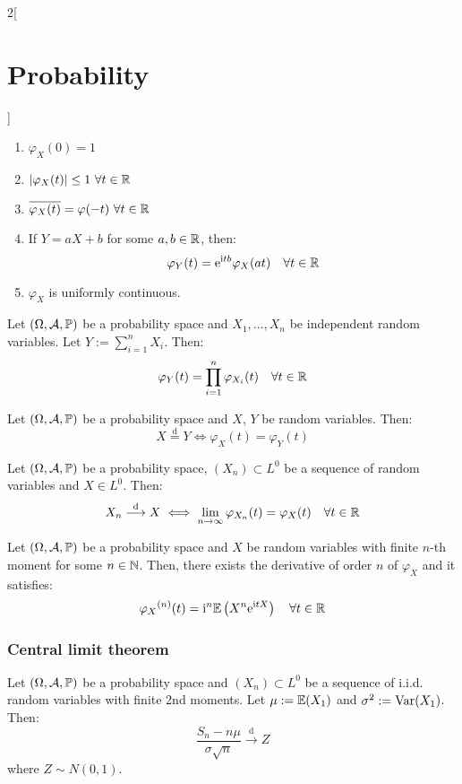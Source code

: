 \documentclass[../../../main.tex]{subfiles}
\begin{document}
\begin{multicols}{2}[\section{Probability}]
\begin{prop}
\begin{enumerate}
            \item $\varphi_X(0)=1$
            \item $|\varphi_X(t)|\leq 1\ \forall t\in\mathbb{R}$
            \item $\overline{\varphi_X(t)}=\varphi(-t)\ \forall t\in\RR$
            \item If $Y=aX+b$ for some $a,b\in \mathbb{R}$, then: $$\varphi_Y(t)=\mathrm{e}^{\mathrm{i} t b}\varphi_X(at)\quad\forall t\in\mathbb{R}$$
            \item $\varphi_X$ is uniformly continuous.
        \end{enumerate}
    \end{prop}
    \begin{theorem}
        Let $(\Omega,\mathcal{A},\mathbb{P})$ be a probability space and $X_1,\ldots,X_n$ be independent random variables. Let $Y:=\sum_{i=1}^n X_i$. Then: $$\varphi_Y(t)=\prod_{i=1}^n\varphi_{X_i}(t)\quad\forall t\in\mathbb{R}$$
    \end{theorem}
    \begin{theorem}
        Let $(\Omega,\mathcal{A},\mathbb{P})$ be a probability space and $X$, $Y$ be random variables. Then: $$X\overset{\text{d}}{=}Y\iff \varphi_X(t)=\varphi_Y(t)$$
    \end{theorem}
    \begin{theorem}
        Let $(\Omega,\mathcal{A},\mathbb{P})$ be a probability space, $(X_n)\subset L^0$ be a sequence of random variables and $X\in L^0$. Then:
        $$X_n\overset{\text{d}}{\longrightarrow} X\iff\lim_{n\to\infty}\varphi_{X_n}(t)=\varphi_X(t)\quad\forall t\in\mathbb{R}$$
    \end{theorem}
    \begin{prop}
        Let $(\Omega,\mathcal{A},\mathbb{P})$ be a probability space and $X$ be random variables with finite $n$-th moment for some $n\in\mathbb{N}$. Then, there exists the derivative of order $n$ of $\varphi_X$ and it satisfies: $${\varphi_X}^{(n)}(t)=\mathrm{i}^n\mathbb{E}\left(X^n\mathrm{e}^{\mathrm{i} t X}\right)\quad\forall t\in\mathbb{R}$$
    \end{prop}
    \subsubsection{Central limit theorem}
    \begin{theorem}
        Let $(\Omega,\mathcal{A},\mathbb{P})$ be a probability space and $(X_n)\subset L^0$ be a sequence of i.i.d. random variables with finite 2nd moments. Let $\mu:=\mathbb{E}(X_1)$ and $\sigma^2:=\operatorname{Var}(X_1)$. Then: $$\frac{S_n-n\mu}{\sigma\sqrt{n}}\overset{\text{d}}{\longrightarrow} Z$$
        where $Z\sim N(0,1)$.
    \end{theorem}
\end{multicols}
\end{document}
